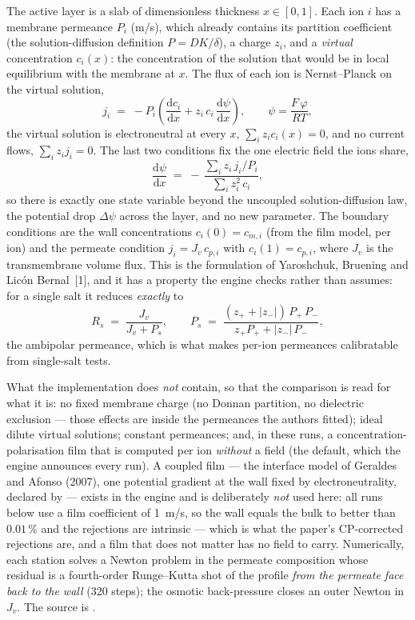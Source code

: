The active layer is a slab of dimensionless thickness $x \in [0,1]$.  Each
ion $i$ has a membrane permeance $P_i$ (m/s), which already contains its
partition coefficient (the solution-diffusion definition $P = DK/\delta$), a
charge $z_i$, and a \emph{virtual} concentration $c_i(x)$: the concentration
of the solution that would be in local equilibrium with the membrane at $x$.
The flux of each ion is Nernst--Planck on the virtual solution,
\[
  j_i \;=\; -P_i\left(\frac{\mathrm{d}c_i}{\mathrm{d}x} + z_i\,c_i\,\frac{\mathrm{d}\psi}{\mathrm{d}x}\right),
  \qquad \psi = \frac{F\,\varphi}{RT},
\]
the virtual solution is electroneutral at every $x$, $\sum_i z_i c_i(x) = 0$,
and no current flows, $\sum_i z_i j_i = 0$.  The last two conditions fix the
one electric field the ions share,
\[
  \frac{\mathrm{d}\psi}{\mathrm{d}x} \;=\; -\,\frac{\sum_i z_i\, j_i / P_i}{\sum_i z_i^2\, c_i},
\]
so there is exactly one state variable beyond the uncoupled solution-diffusion
law, the potential drop $\Delta\psi$ across the layer, and no new parameter.
The boundary conditions are the wall concentrations $c_i(0) = c_{m,i}$
(from the film model, per ion) and the permeate condition $j_i = J_v\,c_{p,i}$
with $c_i(1) = c_{p,i}$, where $J_v$ is the transmembrane volume flux.  This
is the formulation of Yaroshchuk, Bruening and Lic\'on Bernal~[1], and it has
a property the engine checks rather than
assumes: for a single salt it reduces \emph{exactly} to
\[
  R_s \;=\; \frac{J_v}{J_v + P_s}, \qquad
  P_s \;=\; \frac{(z_+ + |z_-|)\,P_+\,P_-}{z_+ P_+ + |z_-|\,P_-},
\]
the ambipolar permeance, which is what makes per-ion permeances calibratable
from single-salt tests.

What the implementation does \emph{not} contain, so that the comparison is
read for what it is: no fixed membrane charge (no Donnan partition, no
dielectric exclusion --- those effects are inside the permeances the authors
fitted); ideal dilute virtual solutions; constant permeances; and, in
these runs, a concentration-polarisation film that is computed per ion
\emph{without} a field (the default, which the engine announces every
run).  A coupled film --- the interface model of Geraldes and Afonso
(2007), one potential gradient at the wall fixed by electroneutrality,
declared by  ---
exists in the engine and is deliberately \emph{not} used here: all runs
below use a film coefficient of 1~m/s, so the wall equals the bulk to
better than $0.01\,\%$ and the rejections are intrinsic --- which is what
the paper's CP-corrected rejections are, and a film that does not matter
has no field to carry.  Numerically, each station solves a Newton problem in the
permeate composition whose residual is a fourth-order Runge--Kutta shot of
the profile \emph{from the permeate face back to the wall} (320 steps); the
osmotic back-pressure closes an outer Newton in $J_v$.  The source is
.

